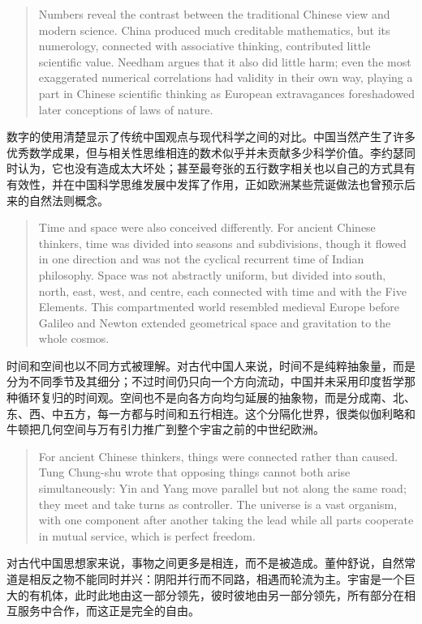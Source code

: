 \documentclass[UTF8,zihao=-4]{ctexart}
\newenvironment{enblock}
  {\par\smallskip\noindent{\scriptsize\bfseries English}\par\begin{quote}\small}
  {\end{quote}}
\newenvironment{zhblock}
  {\par\noindent{\scriptsize\bfseries 中文}\par}
  {\par\medskip}
\begin{document}
\begin{enblock}
Numbers reveal the contrast between the traditional Chinese view and modern science. China produced much creditable mathematics, but its numerology, connected with associative thinking, contributed little scientific value. Needham argues that it also did little harm; even the most exaggerated numerical correlations had validity in their own way, playing a part in Chinese scientific thinking as European extravagances foreshadowed later conceptions of laws of nature.
\end{enblock}
\begin{zhblock}
数字的使用清楚显示了传统中国观点与现代科学之间的对比。中国当然产生了许多优秀数学成果，但与相关性思维相连的数术似乎并未贡献多少科学价值。李约瑟同时认为，它也没有造成太大坏处；甚至最夸张的五行数字相关也以自己的方式具有有效性，并在中国科学思维发展中发挥了作用，正如欧洲某些荒诞做法也曾预示后来的自然法则概念。
\end{zhblock}

\begin{enblock}
Time and space were also conceived differently. For ancient Chinese thinkers, time was divided into seasons and subdivisions, though it flowed in one direction and was not the cyclical recurrent time of Indian philosophy. Space was not abstractly uniform, but divided into south, north, east, west, and centre, each connected with time and with the Five Elements. This compartmented world resembled medieval Europe before Galileo and Newton extended geometrical space and gravitation to the whole cosmos.
\end{enblock}
\begin{zhblock}
时间和空间也以不同方式被理解。对古代中国人来说，时间不是纯粹抽象量，而是分为不同季节及其细分；不过时间仍只向一个方向流动，中国并未采用印度哲学那种循环复归的时间观。空间也不是向各方向均匀延展的抽象物，而是分成南、北、东、西、中五方，每一方都与时间和五行相连。这个分隔化世界，很类似伽利略和牛顿把几何空间与万有引力推广到整个宇宙之前的中世纪欧洲。
\end{zhblock}

\begin{enblock}
For ancient Chinese thinkers, things were connected rather than caused. Tung Chung-shu wrote that opposing things cannot both arise simultaneously: Yin and Yang move parallel but not along the same road; they meet and take turns as controller. The universe is a vast organism, with one component after another taking the lead while all parts cooperate in mutual service, which is perfect freedom.
\end{enblock}
\begin{zhblock}
对古代中国思想家来说，事物之间更多是相连，而不是被造成。董仲舒说，自然常道是相反之物不能同时并兴：阴阳并行而不同路，相遇而轮流为主。宇宙是一个巨大的有机体，此时此地由这一部分领先，彼时彼地由另一部分领先，所有部分在相互服务中合作，而这正是完全的自由。
\end{zhblock}
\end{document}
